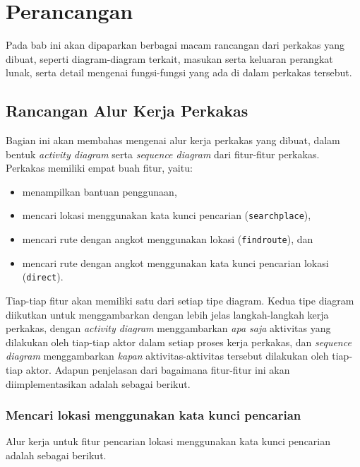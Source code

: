 \chapter{Perancangan}
\label{chap:design}

Pada bab ini akan dipaparkan berbagai macam rancangan dari perkakas \cl\xspace yang dibuat, seperti diagram-diagram terkait, masukan serta keluaran perangkat lunak, serta detail mengenai fungsi-fungsi yang ada di dalam perkakas tersebut.

\section{Rancangan Alur Kerja Perkakas}
\label{sec:design-flow}

Bagian ini akan membahas mengenai alur kerja perkakas yang dibuat, dalam bentuk \textit{activity diagram} serta \textit{sequence diagram} dari fitur-fitur perkakas. Perkakas memiliki empat buah fitur, yaitu:

\begin{itemize}
	\item menampilkan bantuan penggunaan,
	\item mencari lokasi menggunakan kata kunci pencarian (\verb|searchplace|),
	\item mencari rute dengan angkot menggunakan \latlon\xspace lokasi (\verb|findroute|), dan
	\item mencari rute dengan angkot menggunakan kata kunci pencarian lokasi (\verb|direct|).
\end{itemize}

\noindent
Tiap-tiap fitur akan memiliki satu dari setiap tipe diagram. Kedua tipe diagram diikutkan untuk menggambarkan dengan lebih jelas langkah-langkah kerja perkakas, dengan \textit{activity diagram} menggambarkan \textit{apa saja} aktivitas yang dilakukan oleh tiap-tiap aktor dalam setiap proses kerja perkakas, dan \textit{sequence diagram} menggambarkan \textit{kapan} aktivitas-aktivitas tersebut dilakukan oleh tiap-tiap aktor. Adapun penjelasan dari bagaimana fitur-fitur ini akan diimplementasikan adalah sebagai berikut.

\subsection{Mencari lokasi menggunakan kata kunci pencarian}
\label{sec:design-flow-searchplace}

Alur kerja untuk fitur pencarian lokasi menggunakan kata kunci pencarian adalah sebagai berikut.

